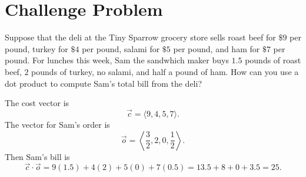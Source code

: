 \documentclass[handout]{ximera}
\begin{document}
\section{Challenge Problem}
\begin{problem}
Suppose that the deli at the Tiny Sparrow grocery store sells roast beef for $ \$ 9$ per pound, turkey for $ \$ 4$ per pound, salami for $\$ 5$ per pound, and ham for $\$ 7$ per pound.  
For lunches this week, Sam the sandwhich maker buys $1.5$ pounds of roast beef, $2$ pounds of turkey, no salami, and half a pound of ham.  
How can you use a dot product to compute Sam's total bill from the deli?
	\begin{freeResponse}
	The cost vector is
		\[
		\vec{c} = \langle 9,4,5,7 \rangle.
		\]
	The vector for Sam's order is
		\[
		\vec{o} = \left\langle \frac{3}{2}, 2, 0, \frac{1}{2} \right\rangle.
		\]
	Then Sam's bill is
		\[
		\vec{c} \cdot \vec{o} = 9(1.5) + 4(2) + 5(0) + 7(0.5) = 13.5 + 8 + 0 + 3.5 = \boxed{25}.
		\]
	\end{freeResponse}
	
\end{problem}

\begin{instructorNotes}

\end{instructorNotes}






	
	
	
	
	
	
	
	
	

	










								
				
				
	
\end{document}
